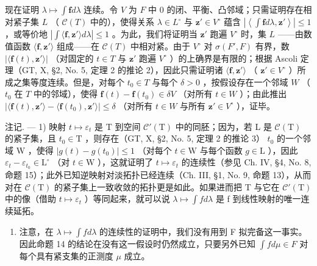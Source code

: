 现在证明 \(\lambda \mapsto \int \mathbf{f}d\lambda\) 连续。令 \(V\) 为 \(F\) 中 0 的闭、平衡、凸邻域；只需证明存在相对紧子集 \(L\) （ \(\mathcal{C}(T)\) 中的），使得关系 \(\lambda \in L^{\circ}\) 与 \(\mathbf{z}' \in V^{\circ}\) 蕴含 \(\left|\left\langle \int \mathbf{f}d\lambda, \mathbf{z}' \right\rangle \right| \leqslant 1\) ，或等价地 \(\left|\int \langle \mathbf{f}, \mathbf{z}' \rangle d\lambda \right| \leqslant 1\) 。为此，我们将证明当 \(\mathbf{z}'\) 跑遍 \(V^{\circ}\) 时，集 \(L\) ——由数值函数 \(\langle \mathbf{f}, \mathbf{z}' \rangle\) 组成——在 \(\mathcal{C}(T)\) 中相对紧。由于 \(V^{\circ}\) 对 \(\sigma(F', F)\) 有界，数 \(|\langle \mathbf{f}(t), \mathbf{z}' \rangle|\) （对固定的 \(t \in T\) 与 \(\mathbf{z}'\) 跑遍 \(V^{\circ}\) ）的上确界是有限的；根据 Ascoli 定理（GT, X, §2, No. 5, 定理 2 的推论 2），因此只需证明诸 \(\langle \mathbf{f}, \mathbf{z}' \rangle\) （ \(\mathbf{z}' \in V^{\circ}\) ）所成之集等度连续。但是，对每个 \(t_0 \in T\) 与每个 \(\delta > 0\) ，按假设存在一个邻域 \(W\) （ \(t_0\) 在 \(T\) 中的邻域），使得 \(\mathbf{f}(t) - \mathbf{f}(t_0) \in \delta V\) （对所有 \(t \in W\) ）；由此推出 \(|\langle \mathbf{f}(t), \mathbf{z}' \rangle - \langle \mathbf{f}(t_0), \mathbf{z}' \rangle| \leqslant \delta\) （对所有 \(t \in W\) 与所有 \(\mathbf{z}' \in V^{\circ}\) ），证毕。

注记. --- 1) 映射 \(t \mapsto \varepsilon_t\) 是 T 到空间 \(\mathcal{C}'(\mathrm{T})\) 中的同胚；因为，若 L 是 \(\mathcal{C}(\mathrm{T})\) 的紧子集，且 \(t_0 \in \mathrm{T}\) ，则存在（GT, X, §2, No. 5, 定理 2 的推论 3） \(t_0\) 的一个邻域 W ，使得 \(|g(t) - g(t_0)| \leqslant 1\) （对每个 \(t \in \mathrm{W}\) 与每个函数 \(g \in \mathrm{L}\) ），因此 \(\varepsilon_t - \varepsilon_{t_0} \in \mathrm{L}^\circ\) （对 \(t \in \mathrm{W}\) ），这就证明了 \(t \mapsto \varepsilon_t\) 的连续性（参见 Ch. IV, §4, No. 8, 命题 15）；此外已知逆映射对淡拓扑已经连续（Ch. III, §1, No. 9, 命题 13），从而对在 \(\mathcal{C}(\mathrm{T})\) 的紧子集上一致收敛的拓扑更是如此。如果进而把 T 与它在 \(\mathcal{C}'(\mathrm{T})\) 中的像（借助 \(t \mapsto \varepsilon_t\) ）等同起来，就可以说 \(\lambda \mapsto \int f d\lambda\) 是 f 到线性映射的唯一连续延拓。

\begin{enumerate}
\def\labelenumi{\arabic{enumi})}
\setcounter{enumi}{1}
\tightlist
\item
  注意，在 \(\lambda\mapsto\int f d\lambda\) 的连续性的证明中，我们没有用到 F 拟完备这一事实。因此命题 14 的结论在没有这一假设时仍然成立，只要另外已知 \(\int f d\mu\in F\) 对每个具有紧支集的正测度 \(\mu\) 成立。
\end{enumerate}

